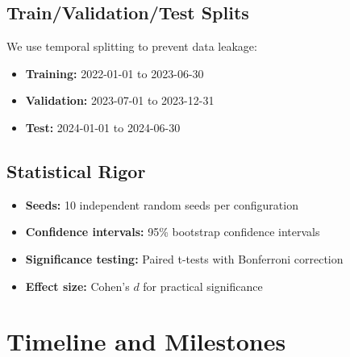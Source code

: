 \documentclass[11pt,a4paper]{article}
\begin{document}
\subsection{Train/Validation/Test Splits}

We use temporal splitting to prevent data leakage:
\begin{itemize}[leftmargin=2em]
    \item \textbf{Training:} 2022-01-01 to 2023-06-30
    \item \textbf{Validation:} 2023-07-01 to 2023-12-31
    \item \textbf{Test:} 2024-01-01 to 2024-06-30
\end{itemize}

\subsection{Statistical Rigor}

\begin{itemize}[leftmargin=2em]
    \item \textbf{Seeds:} 10 independent random seeds per configuration
    \item \textbf{Confidence intervals:} 95\% bootstrap confidence intervals
    \item \textbf{Significance testing:} Paired t-tests with Bonferroni correction
    \item \textbf{Effect size:} Cohen's $d$ for practical significance
\end{itemize}

\section{Timeline and Milestones}\label{sec:timeline}
\end{document}
